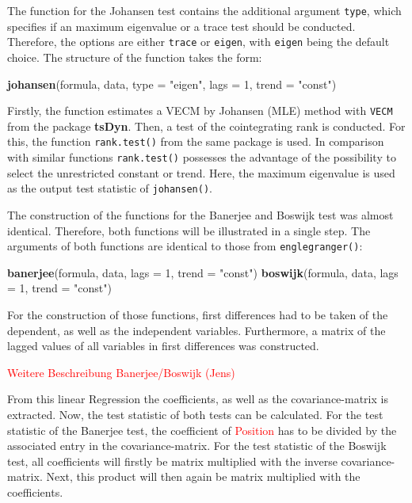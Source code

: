 \documentclass[11.5pt,a4paper]{article}
\newenvironment{Shaded}{\begin{snugshade}}{\end{snugshade}}
\newcommand{\DataTypeTok}[1]{\textcolor[rgb]{0.13,0.29,0.53}{#1}}
\newcommand{\DecValTok}[1]{\textcolor[rgb]{0.00,0.00,0.81}{#1}}
\newcommand{\KeywordTok}[1]{\textcolor[rgb]{0.13,0.29,0.53}{\textbf{#1}}}
\newcommand{\NormalTok}[1]{#1}
\newcommand{\StringTok}[1]{\textcolor[rgb]{0.31,0.60,0.02}{#1}}
\begin{document}
The function for the Johansen test contains the additional argument
\texttt{type}, which specifies if an maximum eigenvalue or a trace test
should be conducted. Therefore, the options are either \texttt{trace} or
\texttt{eigen}, with \texttt{eigen} being the default choice. The
structure of the function takes the form:

\begin{Shaded}
\begin{Highlighting}[]
\KeywordTok{johansen}\NormalTok{(formula, data, }\DataTypeTok{type =} \StringTok{"eigen"}\NormalTok{, }\DataTypeTok{lags =} \DecValTok{1}\NormalTok{, }\DataTypeTok{trend =} \StringTok{"const"}\NormalTok{)}
\end{Highlighting}
\end{Shaded}

Firstly, the function estimates a VECM by Johansen (MLE) method with
\texttt{VECM} from the package \textbf{tsDyn}. Then, a test of the
cointegrating rank is conducted. For this, the function
\texttt{rank.test()} from the same package is used. In comparison with
similar functions \texttt{rank.test()} possesses the advantage of the
possibility to select the unrestricted constant or trend. Here, the
maximum eigenvalue is used as the output test statistic of
\texttt{johansen()}.

The construction of the functions for the Banerjee and Boswijk test was
almost identical. Therefore, both functions will be illustrated in a
single step. The arguments of both functions are identical to those from
\texttt{englegranger()}:

\begin{Shaded}
\begin{Highlighting}[]
\KeywordTok{banerjee}\NormalTok{(formula, data, }\DataTypeTok{lags =} \DecValTok{1}\NormalTok{, }\DataTypeTok{trend =} \StringTok{"const"}\NormalTok{)}
\KeywordTok{boswijk}\NormalTok{(formula, data, }\DataTypeTok{lags =} \DecValTok{1}\NormalTok{, }\DataTypeTok{trend =} \StringTok{"const"}\NormalTok{)}
\end{Highlighting}
\end{Shaded}

For the construction of those functions, first differences had to be
taken of the dependent, as well as the independent variables.
Furthermore, a matrix of the lagged values of all variables in first
differences was constructed.

\textcolor{red}{Weitere Beschreibung Banerjee/Boswijk (Jens)}

From this linear Regression the coefficients, as well as the
covariance-matrix is extracted. Now, the test statistic of both tests
can be calculated. For the test statistic of the Banerjee test, the
coefficient of \textcolor{red}{Position} has to be divided by the
associated entry in the covariance-matrix. For the test statistic of the
Boswijk test, all coefficients will firstly be matrix multiplied with
the inverse covariance-matrix. Next, this product will then again be
matrix multiplied with the coefficients.
\end{document}
